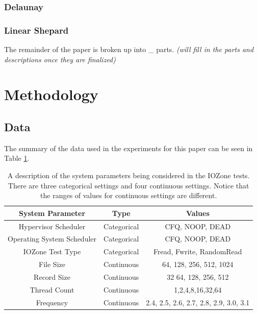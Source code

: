 \documentclass{scspaperproc}
\theoremstyle{scsthe}
\begin{document}
\subsubsection{Delaunay}
\subsubsection{Linear Shepard}

The remainder of the paper is broken up into \_ parts. \textit{(will
  fill in the parts and descriptions once they are finalized)}



\section{Methodology}
\subsection{Data}
The summary of the data used in the experiments for this paper can be
seen in Table \ref{tab:data_type}.

\begin{table}
  \centering
  \begin{tabular}{|c|c|c|}
    \hline
    \textbf{System Parameter} & \textbf{Type} & \textbf{Values}\\
    \hline
    Hypervisor Scheduler & Categorical & CFQ, NOOP, DEAD\\
    Operating System Scheduler & Categorical & CFQ, NOOP, DEAD\\
    IOZone Test Type & Categorical & Fread, Fwrite, RandomRead\\
    File Size & Continuous & 64, 128, 256, 512, 1024\\
    Record Size & Continuous & 32 64, 128, 256, 512\\
    Thread Count & Continuous & 1,2,4,8,16,32,64\\
    Frequency & Continuous & 2.4, 2.5, 2.6, 2.7, 2.8, 2.9, 3.0, 3.1\\
    \hline
  \end{tabular}
  \caption{A description of the system parameters being considered in
    the IOZone tests. There are three categorical settings and four
    continuous settings. Notice that the ranges of values for
    continuous settings are different.}
  \label{tab:data_type}
\end{table}
\end{document}
